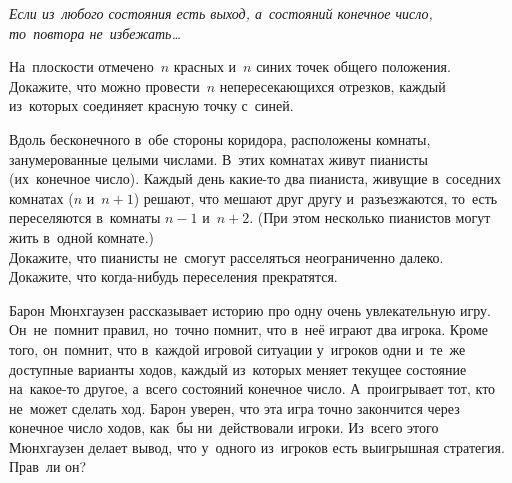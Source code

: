 



\emph{Если из~любого состояния есть выход, а~состояний конечное число,
то~повтора не~избежать\ldots}

\begin{problems}

\item
На~плоскости отмечено~$n$ красных и~$n$ синих точек общего положения.
Докажите, что можно провести~$n$ непересекающихся отрезков,
каждый из~которых соединяет красную точку с~синей.

\item
Вдоль бесконечного в~обе стороны коридора, расположены комнаты, занумерованные
целыми числами.
В~этих комнатах живут пианисты (их~конечное число).
Каждый день какие-то два пианиста, живущие в~соседних комнатах ($n$ и~$n+1$)
решают, что мешают друг другу и~разъезжаются, то~есть переселяются в~комнаты
$n-1$ и~$n+2$.
(При этом несколько пианистов могут жить в~одной комнате.)
\\
\sp
Докажите, что пианисты не~смогут расселяться неограниченно далеко.
\\
\sp
Докажите, что когда-нибудь переселения прекратятся.

\item
Барон Мюнхгаузен рассказывает историю про одну очень увлекательную игру.
Он~не~помнит правил, но~точно помнит, что в~неё играют два игрока.
Кроме того, он~помнит, что в~каждой игровой ситуации у~игроков одни и~те~же
доступные варианты ходов, каждый из~которых меняет текущее состояние
на~какое-то другое, а~всего состояний конечное число.
А~проигрывает тот, кто не~может сделать ход.
Барон уверен, что эта игра точно закончится через конечное число ходов, как~бы
ни~действовали игроки.
Из~всего этого Мюнхгаузен делает вывод, что у~одного из~игроков есть выигрышная
стратегия.
Прав~ли он?

\end{problems}

